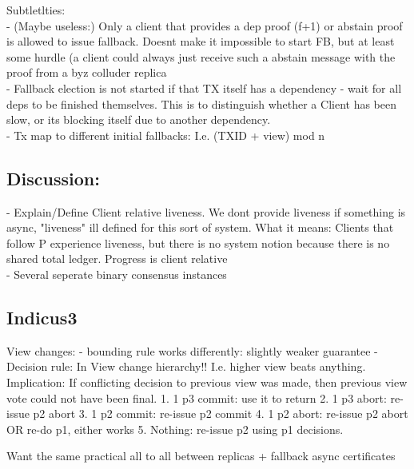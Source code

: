 Subtletlties:\\
- (Maybe useless:) Only a client that provides a dep proof (f+1) or abstain proof is allowed to issue fallback. Doesnt make it impossible to start FB, but at least some hurdle (a client could always just receive such a abstain message with the proof from a byz colluder replica\\
- Fallback election is not started if that TX itself has a dependency - wait for all deps to be finished themselves. This is to distinguish whether a Client has been slow, or its blocking itself due to another dependency.\\
- Tx map to different initial fallbacks: I.e. (TXID + view) mod n \\


\subsection{Discussion: }
- Explain/Define Client relative liveness. We dont provide liveness if something is async, "liveness" ill defined for this sort of system. What it means: Clients that follow P experience liveness, but there is no system notion because there is no shared total ledger.  Progress is client relative\\
- Several seperate binary consensus instances \\


\subsection{Indicus3}



View changes:
- bounding rule works differently: slightly weaker guarantee
- Decision rule: In View change hierarchy!! I.e. higher view beats anything. Implication: If conflicting decision to previous view was made, then previous view vote could not have been final.
	1. 1 p3 commit: use it to return
	2. 1 p3 abort: re-issue p2 abort 
	3. 1 p2 commit: re-issue p2 commit
	4. 1 p2 abort: re-issue p2 abort OR re-do p1, either works
	5. Nothing: re-issue p2 using p1 decisions.
	
Want the same practical all to all between replicas + fallback async certificates 